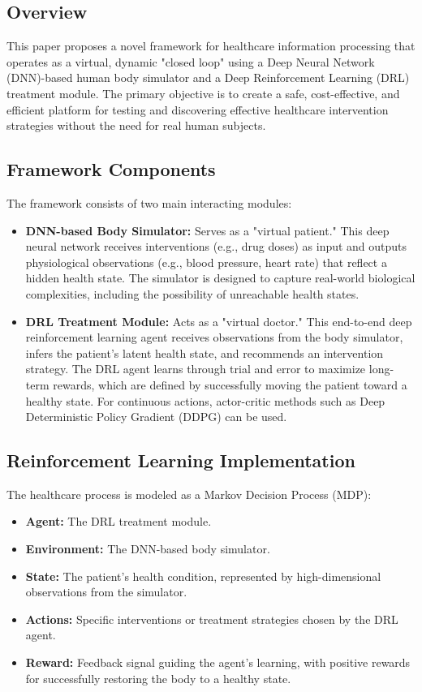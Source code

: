 \subsection*{Overview}
This paper proposes a novel framework for healthcare information processing that operates as a virtual, dynamic "closed loop" using a Deep Neural Network (DNN)-based human body simulator and a Deep Reinforcement Learning (DRL) treatment module. The primary objective is to create a safe, cost-effective, and efficient platform for testing and discovering effective healthcare intervention strategies without the need for real human subjects.

\subsection*{Framework Components}
The framework consists of two main interacting modules:
\begin{itemize}
    \item \textbf{DNN-based Body Simulator:} Serves as a "virtual patient." This deep neural network receives interventions (e.g., drug doses) as input and outputs physiological observations (e.g., blood pressure, heart rate) that reflect a hidden health state. The simulator is designed to capture real-world biological complexities, including the possibility of unreachable health states.
    \item \textbf{DRL Treatment Module:} Acts as a "virtual doctor." This end-to-end deep reinforcement learning agent receives observations from the body simulator, infers the patient's latent health state, and recommends an intervention strategy. The DRL agent learns through trial and error to maximize long-term rewards, which are defined by successfully moving the patient toward a healthy state. For continuous actions, actor-critic methods such as Deep Deterministic Policy Gradient (DDPG) can be used.
\end{itemize}

\subsection*{Reinforcement Learning Implementation}
The healthcare process is modeled as a Markov Decision Process (MDP):
\begin{itemize}
    \item \textbf{Agent:} The DRL treatment module.
    \item \textbf{Environment:} The DNN-based body simulator.
    \item \textbf{State:} The patient's health condition, represented by high-dimensional observations from the simulator.
    \item \textbf{Actions:} Specific interventions or treatment strategies chosen by the DRL agent.
    \item \textbf{Reward:} Feedback signal guiding the agent's learning, with positive rewards for successfully restoring the body to a healthy state.
\end{itemize}

